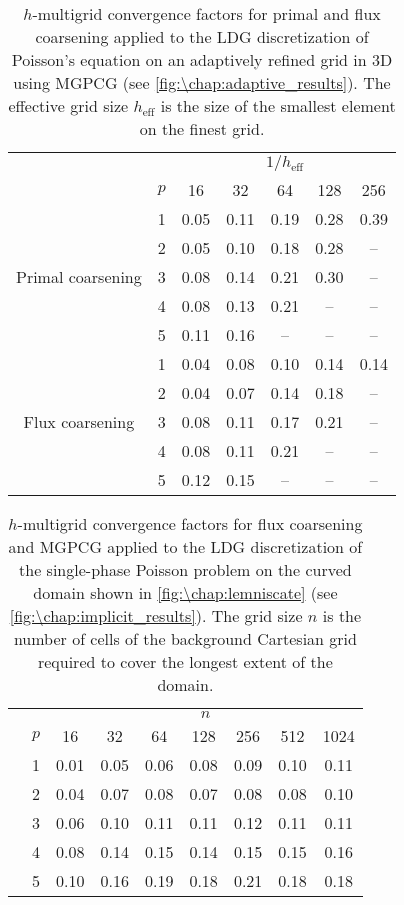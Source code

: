 \begin{table}[htb]
\caption{$h$-multigrid convergence factors for primal and flux coarsening applied to the LDG discretization of Poisson's equation on an adaptively refined grid in 3D using MGPCG (see \cref{fig:\chap:adaptive_results}). The effective grid size $h_\text{eff}$ is the size of the smallest element on the finest grid.\vspace{-1.8em}}
\label{tab:3D_adaptive}
\centering
\small
\begin{tabular}{@{}cl@{\qquad}ccccc@{}}
&&&&&& \\ \midrule
&& \multicolumn{5}{c}{$1/h_\text{eff}$} \\
& $p$ & 16 & 32 & 64 & 128 & 256 \\ \cmidrule{1-7}
\multirow{5}{*}{Primal coarsening}
& 1 & 0.05 & 0.11 & 0.19 & 0.28 & 0.39 \\ 
& 2 & 0.05 & 0.10 & 0.18 & 0.28 &  --  \\ 
& 3 & 0.08 & 0.14 & 0.21 & 0.30 &  --  \\ 
& 4 & 0.08 & 0.13 & 0.21 &  --  &  --  \\ 
& 5 & 0.11 & 0.16 &  --  &  --  &  --  \\ \cmidrule{1-7}
\multirow{5}{*}{Flux coarsening}
& 1 & 0.04 & 0.08 & 0.10 & 0.14 & 0.14 \\ 
& 2 & 0.04 & 0.07 & 0.14 & 0.18 &  --  \\ 
& 3 & 0.08 & 0.11 & 0.17 & 0.21 &  --  \\ 
& 4 & 0.08 & 0.11 & 0.21 &  --  &  --  \\ 
& 5 & 0.12 & 0.15 &  --  &  --  &  --  \\ \midrule
\end{tabular}
\end{table}

\begin{table}[htb]
\caption{$h$-multigrid convergence factors for flux coarsening and MGPCG applied to the LDG discretization of the single-phase Poisson problem on the curved domain shown in \cref{fig:\chap:lemniscate} (see \cref{fig:\chap:implicit_results}). The grid size $n$ is the number of cells of the background Cartesian grid required to cover the longest extent of the domain.\vspace{-1.8em}}
\label{tab:lemniscate}
\centering
\small
\begin{tabular}{@{}cl@{\qquad}ccccccc@{}}
&&&&&&&& \\ \midrule
&& \multicolumn{7}{c}{$n$} \\
& $p$ & 16 & 32 & 64 & 128 & 256 & 512 & 1024 \\ \cmidrule{1-9}
& 1 & 0.01 & 0.05 & 0.06 & 0.08 & 0.09 & 0.10 & 0.11 \\ 
& 2 & 0.04 & 0.07 & 0.08 & 0.07 & 0.08 & 0.08 & 0.10 \\ 
& 3 & 0.06 & 0.10 & 0.11 & 0.11 & 0.12 & 0.11 & 0.11 \\ 
& 4 & 0.08 & 0.14 & 0.15 & 0.14 & 0.15 & 0.15 & 0.16 \\ 
& 5 & 0.10 & 0.16 & 0.19 & 0.18 & 0.21 & 0.18 & 0.18 \\ \midrule
\end{tabular}
\end{table}

